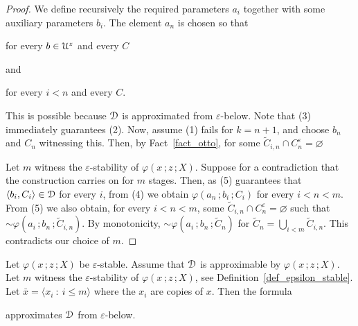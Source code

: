 \begin{proof}
  We define recursively the required parameters $a_i$ together with some auxiliary parameters $b_i$.
  The element $a_n$ is chosen so that

\hfill for every $b\in{\EuScript U}^z$ and every $C$

and

\hfill for every $i<n$ and every $C$.\smallskip

This is possible because ${\EuScript D}$ is approximated from $\varepsilon$-below.
Note that (3) immediately guarantees (2).
Now, assume (1) fails for $k=n+1$, and choose $b_n$ and $C_n$ witnessing this.
Then, by Fact~\ref{fact_otto}, for some $\tilde C_{i,n}\cap C_n^\varepsilon=\varnothing$


Let $m$ witness the $\varepsilon$-stability of $\varphi(x\,;z\,;X)$.
Suppose for a contradiction that the construction carries on for $m$ stages.
Then, as (5) guarantees that $\langle b_i,C_i\rangle\in{\EuScript D}$ for every $i$, from (4) we obtain $\varphi(a_n\,;b_i\,;C_i)$ for every $i<n<m$.
From (5) we also obtain, for every $i< n<m$, some $\tilde C_{i,n}\cap C_n^\varepsilon=\varnothing$ such that ${\sim}\varphi(a_i\,;b_n\,;\tilde C_{i,n})$.
By monotonicity, ${\sim}\varphi(a_i\,;b_n\,;\tilde C_n)$ for $\tilde C_n=\bigcup_{i< m}\tilde C_{i,n}$.
This contradicts our choice of $m$.
\end{proof}

\begin{lemma}
  Let $\varphi(x\,;z\,;X)$ be $\varepsilon$-stable.
  Assume that ${\EuScript D}$ is approximable by $\varphi(x\,;z\,;X)$.
  Let $m$ witness the $\varepsilon$-stability of  $\varphi(x\,;z\,;X)$, see Definition~\ref{def_epsilon_stable}.
  Let $\bar x=\langle x_i\ :\ i\le m\rangle$ where the $x_i$ are copies of $x$.
  Then the formula\smallskip

  \smallskip

  approximates ${\EuScript D}$ from $\varepsilon$-below.
\end{lemma}


